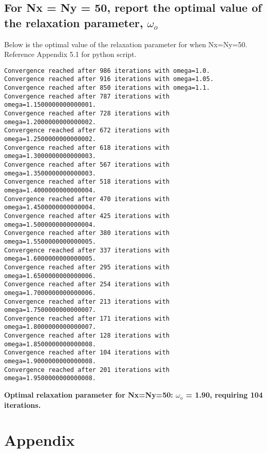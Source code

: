 \documentclass[a4paper, twoside]{article}
\begin{document}
\subsection{For Nx = Ny = 50, report the optimal value of the relaxation parameter, $\omega_o$}
Below is the optimal value of the relaxation parameter for when Nx=Ny=50. Reference Appendix 5.1 for python script. 
\begin{lstlisting}
Convergence reached after 986 iterations with omega=1.0.
Convergence reached after 916 iterations with omega=1.05.
Convergence reached after 850 iterations with omega=1.1.
Convergence reached after 787 iterations with omega=1.1500000000000001.
Convergence reached after 728 iterations with omega=1.2000000000000002.
Convergence reached after 672 iterations with omega=1.2500000000000002.
Convergence reached after 618 iterations with omega=1.3000000000000003.
Convergence reached after 567 iterations with omega=1.3500000000000003.
Convergence reached after 518 iterations with omega=1.4000000000000004.
Convergence reached after 470 iterations with omega=1.4500000000000004.
Convergence reached after 425 iterations with omega=1.5000000000000004.
Convergence reached after 380 iterations with omega=1.5500000000000005.
Convergence reached after 337 iterations with omega=1.6000000000000005.
Convergence reached after 295 iterations with omega=1.6500000000000006.
Convergence reached after 254 iterations with omega=1.7000000000000006.
Convergence reached after 213 iterations with omega=1.7500000000000007.
Convergence reached after 171 iterations with omega=1.8000000000000007.
Convergence reached after 128 iterations with omega=1.8500000000000008.
Convergence reached after 104 iterations with omega=1.9000000000000008.
Convergence reached after 201 iterations with omega=1.9500000000000008.
\end{lstlisting}
\textbf{Optimal relaxation parameter for Nx=Ny=50: $\omega_o$ = 1.90, requiring 104 iterations.}


\newpage 
\section{Appendix}
\end{document}
